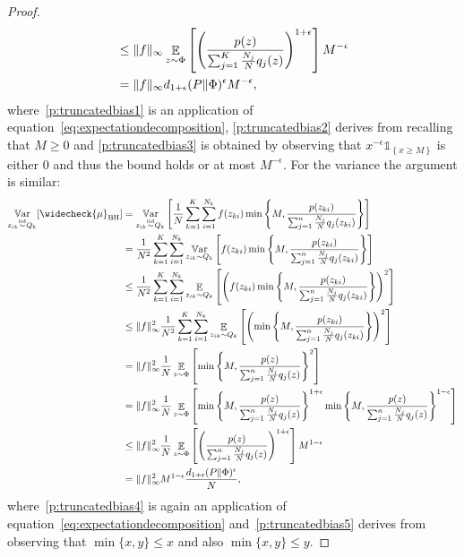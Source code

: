 \documentclass{article}
\begin{document}
\begin{proof}
\begin{align}
    & \le \|f\|_{\infty} \mathop{\mathbb{E}}_{z \sim \Phi} \left[  \left(  \frac{p(z)}{\sum_{j=1}^K \frac{N_j}{N} q_j(z)} \right)^{1+\epsilon} \right] M^{-\epsilon} \label{p:truncatedbias3}\\
        & = \|f\|_{\infty} d_{1+\epsilon}(P \| \Phi)^{\epsilon}  M^{-\epsilon},\notag
    \end{align}
    where~\eqref{p:truncatedbias1} is an application of equation~\eqref{eq:expectationdecomposition}, \eqref{p:truncatedbias2} derives from recalling that $M\ge 0$ and \eqref{p:truncatedbias3} is obtained by observing that $ x^{-\epsilon} \mathds{1}_{\left\{ x \ge M \right\} }$ is either $0$ and thus the bound holds or at most $M^{-\epsilon}$.
    For the variance the argument is similar:
    \begin{align}
    \Var_{z_{ik} \simiid Q_k} [\widecheck{\mu}_{\text{BH}}]&  = \Var_{z_{ik} \simiid Q_k} \left[ \frac{1}{N} \sum_{k=1}^K \sum_{i=1}^{N_k}  f(z_{ki}) \min \left\{ M, \frac{p(z_{ki})}{\sum_{j=1}^n \frac{N_j}{N} q_j(z_{ki})} \right\} \right] \notag\\
    & = \frac{1}{N^2} \sum_{k=1}^K \sum_{i=1}^{N_k} \Var_{z_{ik} \sim Q_k} \left[   f(z_{ki}) \min \left\{ M, \frac{p(z_{ki})}{\sum_{j=1}^n \frac{N_j}{N} q_j(z_{ki})} \right\} \right] \notag\\
    & \le \frac{1}{N^2} \sum_{k=1}^K \sum_{i=1}^{N_k} \Exp_{z_{ik} \sim Q_k} \left[   \left( f(z_{ki})  \min \left\{ M, \frac{p(z_{ki})}{\sum_{j=1}^n \frac{N_j}{N} q_j(z_{ki})} \right\} \right)^2 \right]\notag\\
    & \le \|f\|_{\infty}^2 \frac{1}{N^2} \sum_{k=1}^K \sum_{i=1}^{N_k} \Exp_{z_{ik} \sim Q_k} \left[   \left( \min \left\{ M, \frac{p(z_{ki})}{\sum_{j=1}^n \frac{N_j}{N} q_j(z_{ki})} \right\} \right)^2 \right]\notag\\
    & = \|f\|_{\infty}^2 \frac{1}{N} \Exp_{z \sim \Phi} \left[ \min \left\{ M, \frac{p(z)}{\sum_{j=1}^n \frac{N_j}{N} q_j(z)} \right\}^2 \right] \label{p:truncatedbias4}\\
    & = \|f\|_{\infty}^2 \frac{1}{N} \Exp_{z \sim \Phi} \left[ \min \left\{ M, \frac{p(z)}{\sum_{j=1}^n \frac{N_j}{N} q_j(z)} \right\}^{1+\epsilon} \min \left\{ M, \frac{p(z)}{\sum_{j=1}^n \frac{N_j}{N} q_j(z)} \right\}^{1-\epsilon}  \right]\notag\\
    & \le \|f\|_{\infty}^2 \frac{1}{N} \Exp_{z \sim \Phi} \left[ \left( \frac{p(z)}{\sum_{j=1}^n \frac{N_j}{N} q_j(z)} \right)^{1+\epsilon}  \right] M^{1-\epsilon} \label{p:truncatedbias5}\\
    &= \|f\|_{\infty}^2 M^{1-\epsilon} \frac{d_{1+\epsilon}(P\|\Phi)^{\epsilon}}{N} ,\notag\\
    \end{align}
    where~\eqref{p:truncatedbias4}  is again an application of equation~\eqref{eq:expectationdecomposition} and~\ref{p:truncatedbias5} derives from observing that $\min\{x,y\} \le x$ and also $\min\{x,y\} \le y$.
\end{proof}
\end{document}
